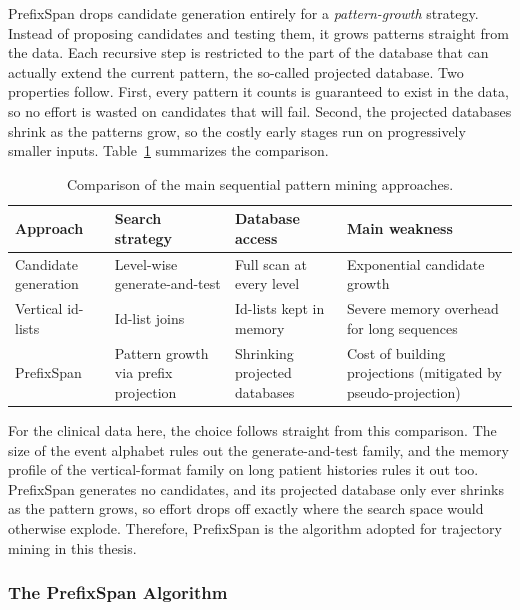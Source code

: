 PrefixSpan \cite{pei2001} drops candidate generation entirely for a \emph{pattern-growth} strategy. Instead of proposing candidates and testing them, it grows patterns straight from the data. Each recursive step is restricted to the part of the database that can actually extend the current pattern, the so-called projected database. Two properties follow. First, every pattern it counts is guaranteed to exist in the data, so no effort is wasted on candidates that will fail. Second, the projected databases shrink as the patterns grow, so the costly early stages run on progressively smaller inputs. Table~\ref{tab:ch4_seq_algos} summarizes the comparison.

\begin{table}[H]
\centering
\footnotesize
\renewcommand{\arraystretch}{1.3}
\begin{tabular}{@{}p{2.2cm} p{3.4cm} p{3.3cm} p{3.9cm}@{}}
\toprule
\textbf{Approach} & \textbf{Search strategy} & \textbf{Database access} & \textbf{Main weakness} \\
\midrule
Candidate generation & Level-wise generate-and-test & Full scan at every level & Exponential candidate growth \\
Vertical id-lists & Id-list joins & Id-lists kept in memory & Severe memory overhead for long sequences \\
PrefixSpan \cite{pei2001} & Pattern growth via prefix projection & Shrinking projected databases & Cost of building projections (mitigated by pseudo-projection) \\
\bottomrule
\end{tabular}
\caption{Comparison of the main sequential pattern mining approaches.}
\label{tab:ch4_seq_algos}
\end{table}

For the clinical data here, the choice follows straight from this comparison. The size of the event alphabet rules out the generate-and-test family, and the memory profile of the vertical-format family on long patient histories rules it out too. PrefixSpan generates no candidates, and its projected database only ever shrinks as the pattern grows, so effort drops off exactly where the search space would otherwise explode. Therefore, PrefixSpan is the algorithm adopted for trajectory mining in this thesis.

\subsubsection*{The PrefixSpan Algorithm}

